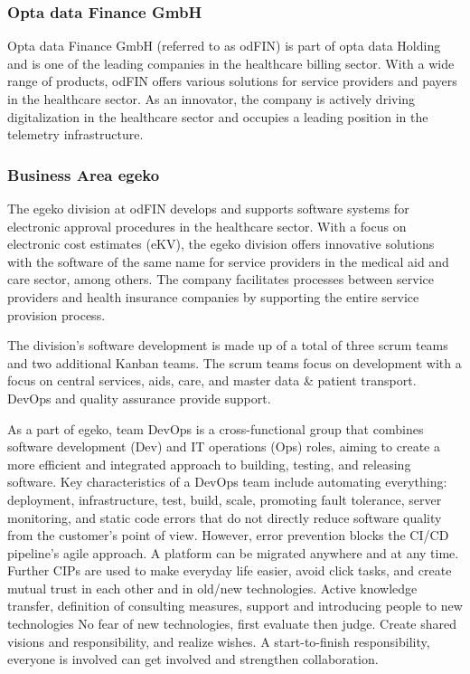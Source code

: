 \subsubsection{Opta data Finance GmbH  }
Opta data Finance GmbH (referred to as odFIN) is part of opta data Holding and is one of the leading companies in the healthcare billing sector. With a wide range of products, odFIN offers various solutions for service providers and payers in the healthcare sector. As an innovator, the company is actively driving digitalization in the healthcare sector and occupies a leading position in the telemetry infrastructure.

\subsubsection{Business Area egeko }
The egeko division at odFIN develops and supports software systems for electronic approval procedures in the healthcare sector. With a focus on electronic cost estimates (eKV), the egeko division offers innovative solutions with the software of the same name for service providers in the medical aid and care sector, among others. The company facilitates processes between service providers and health insurance companies by supporting the entire service provision process.\vspace{.4cm}

The division's software development is made up of a total of three scrum teams and two additional Kanban teams. The scrum teams focus on development with a focus on central services, aids, care, and master data \& patient transport. DevOps and quality assurance provide support.\vspace{.4cm} 

As a part of egeko, team DevOps is a cross-functional group that combines software development (Dev) and IT operations (Ops) roles, aiming to create a more efficient and integrated approach to building, testing, and releasing software. Key characteristics of a DevOps team include automating everything: deployment, infrastructure, test, build, scale, promoting fault tolerance, server monitoring, and static code errors that do not directly reduce software quality from the customer's point of view. However, error prevention blocks the CI/CD pipeline's agile approach. A platform can be migrated anywhere and at any time. Further CIPs are used to make everyday life easier, avoid click tasks, and create mutual trust in each other and in old/new technologies. Active knowledge transfer, definition of consulting measures, support and introducing people to new technologies No fear of new technologies, first evaluate then judge. Create shared visions and responsibility, and realize wishes. A start-to-finish responsibility, everyone is involved can get involved and strengthen collaboration.\vspace{.4cm}

